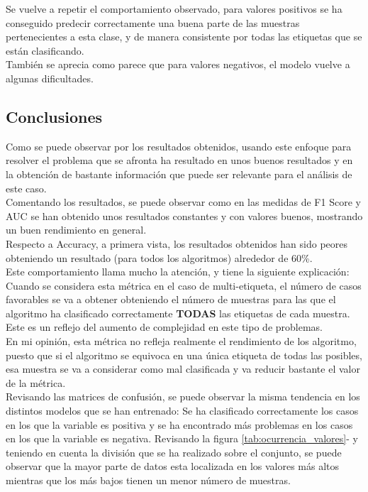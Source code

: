 Se vuelve a repetir el comportamiento observado, para valores positivos se ha conseguido predecir correctamente una buena parte de las muestras pertenecientes a esta clase, y de manera consistente por todas las etiquetas que se están clasificando.\\
También se aprecia como parece que para valores negativos, el modelo vuelve a algunas dificultades.
\subsection{Conclusiones}
Como se puede observar por los resultados obtenidos, usando este enfoque para resolver el problema que se afronta ha resultado en unos buenos resultados y en la obtención de bastante información que puede ser relevante para el análisis de este caso.\\
\linebreak
Comentando los resultados, se puede observar como en las medidas de F1 Score y AUC se han obtenido unos resultados constantes y con valores buenos, mostrando un buen rendimiento en general.\\
Respecto a Accuracy, a primera vista, los resultados obtenidos han sido peores obteniendo un resultado (para todos los algoritmos) alrededor de 60\%.\\
Este comportamiento llama mucho la atención, y tiene la siguiente explicación: Cuando se considera esta métrica en el caso de multi-etiqueta, el número de casos favorables se va a obtener obteniendo el número de muestras para las que el algoritmo ha clasificado correctamente \textbf{TODAS} las etiquetas de cada muestra.\\ Este es un reflejo del aumento de complejidad en este tipo de problemas.\\
En mi opinión, esta métrica no refleja realmente el rendimiento de los algoritmo, puesto que si el algoritmo se equivoca en una única etiqueta de todas las posibles, esa muestra se va a considerar como mal clasificada y va reducir bastante el valor de la métrica.\\
\linebreak
Revisando las matrices de confusión, se puede observar la misma tendencia en los distintos modelos que se han entrenado: Se ha clasificado correctamente los casos en los que la variable es positiva y se ha encontrado más problemas en los casos en los que la variable es negativa. Revisando la figura 	\ref{tab:ocurrencia_valores}- y teniendo en cuenta la división que se ha realizado sobre el conjunto, se puede observar que la mayor parte de datos esta localizada en los valores más altos mientras que los más bajos tienen un menor número de muestras.\\
